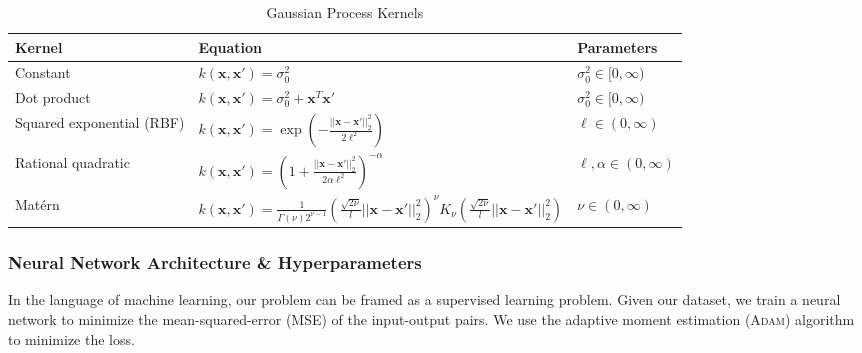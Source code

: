 \documentclass[conference]{IEEEtran}
\begin{document}
	\begin{table*}[htbp]
    \renewcommand{\arraystretch}{2.2}
    \centering
    \caption{Gaussian Process Kernels}
    \label{tab:gp_kernels}
        \begin{tabular}{lll}
        \toprule 
        \bfseries Kernel & \bfseries Equation & \bfseries Parameters \\ \midrule
	    Constant &  $k(\mathbf{x}, \mathbf{x}') = \sigma_0^2$ & $\sigma_0^2 \in [0, \infty)$ \\
	    Dot product & $k(\mathbf{x}, \mathbf{x}') = \sigma_0^2 + \mathbf{x}^T \mathbf{x}'$ & $\sigma_0^2 \in [0, \infty)$ \\
	    Squared exponential (RBF) & $k(\mathbf{x}, \mathbf{x}') = \exp \left( -\frac{||\mathbf{x} - \mathbf{x}'||_2^2}{2\ell^2} \right)$ & $\ell \in (0, \infty)$ \\
	    Rational quadratic & $k(\mathbf{x}, \mathbf{x}') = \left(1+\frac{||\mathbf{x} - \mathbf{x}'||_2^2}{2\alpha \ell^2}\right)^{-\alpha}$ & $\ell, \alpha \in (0, \infty)$ \\
	    Mat\'ern & $k(\mathbf{x}, \mathbf{x}') = \frac{1}{\Gamma(\nu)2^{\nu-1}}\left(\frac{\sqrt{2\nu}}{l} ||\mathbf{x} - \mathbf{x}'||_2^2 \right)^\nu K_\nu\left(\frac{\sqrt{2\nu}}{l} ||\mathbf{x} - \mathbf{x}'||_2^2 \right)$ & $\nu \in (0, \infty)$ \\ \bottomrule
	    \end{tabular}
	\end{table*}
	
	\subsubsection{Neural Network Architecture \& Hyperparameters}
	
	In the language of machine learning, our problem can be framed as a supervised learning problem. Given our dataset, we train a neural network to minimize the mean-squared-error (MSE) of the input-output pairs. We use the adaptive moment estimation (\textsc{Adam}) algorithm to minimize the loss. 
	
\end{document}
